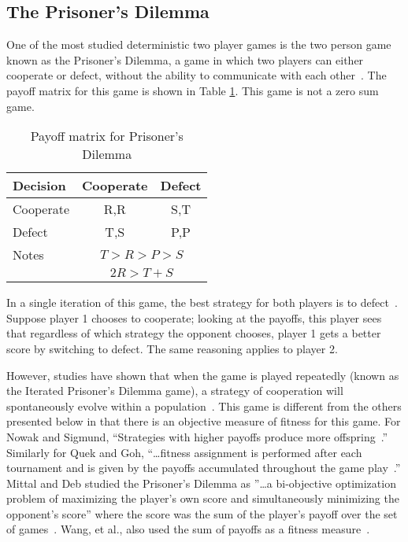 \subsection{The Prisoner's Dilemma}

One of the most studied deterministic two player games is the two person game
known as the Prisoner's Dilemma, a game in which two players can either
cooperate or defect, without the ability to communicate with each
other~\cite{Flood1958,Nowak1993,Mittal2009}. The payoff matrix for this game is
shown in Table \ref{table-pdpayoff}. This game is not a zero sum game.

\begin{table}[h]
\caption{Payoff matrix for Prisoner's Dilemma}
\begin{center}
\begin{tabular}{|l|c|c|}
\hline
\multicolumn{1}{|l|}{{Decision\!}}
& \multicolumn{1}{|c|}{Cooperate}
& \multicolumn{1}{|c|}{Defect} \\ \hline
Cooperate &  R,R & S,T \\ \hline 
Defect    &  T,S & P,P  \\ \hline \hline
Notes & \multicolumn{2}{|c|}{\(T > R > P > S\)} \\ 
      & \multicolumn{2}{|c|}{\(2R > T + S\)} \\ \hline
\end{tabular}
\label{table-pdpayoff}
\end{center}
\end{table}


In a single iteration of this game, the best strategy for both players is to
defect~\cite{nash50,Nash1951}. Suppose player 1 chooses to cooperate;
looking at the payoffs, this player sees that regardless of which strategy the
opponent chooses, player 1 gets a better score by switching to defect. The same
reasoning applies to player 2.

However, studies have shown that when the game is played repeatedly (known as
the Iterated Prisoner's Dilemma game), a strategy of cooperation will
spontaneously evolve within a population~\cite{Axelrod1984, Nowak1993,
DBLP:conf/cig/QuekG07, Mittal2009, WangTao2010}. This game is different from the
others presented below in that there is an objective measure of fitness for this
game. For Nowak and Sigmund, ``Strategies with higher payoffs produce more
offspring~\cite{Nowak1993}.'' Similarly for Quek and Goh, ``\ldots fitness
assignment is performed after each tournament and is given by the payoffs
accumulated throughout the game play~\cite{DBLP:conf/cig/QuekG07}.'' Mittal and
Deb studied the Prisoner's Dilemma as ''\ldots a bi-objective optimization
problem of maximizing the player's own score and simultaneously minimizing the
opponent's score'' where the score was the sum of the player's payoff over the
set of games~\cite{Mittal2009}. Wang, et al., also used the sum of payoffs as a
fitness measure~\cite{WangTao2010}.

